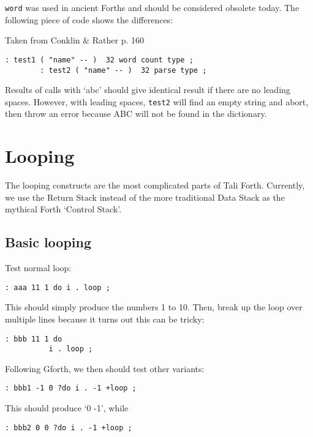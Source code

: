 \texttt{word} was used in ancient Forths and should be
considered obsolete today. The following piece of code shows the differences:

Taken from Conklin \& Rather p. 160

\begin{lstlisting}[frame=lines]
        : test1 ( "name" -- )  32 word count type ; 
        : test2 ( "name" -- )  32 parse type ; 
\end{lstlisting}

\noindent Results of calls with `abc' should give identical result if there are no
leading spaces. However, with leading spaces, \texttt{test2} will find an empty string
and abort, then throw an error because ABC will not be found in the dictionary.

\section{Looping}

The looping constructs are the most complicated parts of Tali Forth. Currently,
we use the Return Stack instead of the more traditional Data Stack as the
mythical Forth `Control Stack'.

\subsection{Basic looping}

Test normal loop:
\begin{lstlisting}[frame=lines]
        : aaa 11 1 do i . loop ;        
\end{lstlisting}

\noindent This should simply produce the numbers 1 to 10. Then, break up the
loop over multiple lines because it turns out this can be tricky:

\begin{lstlisting}[frame=lines]
        : bbb 11 1 do 
          i . loop ; 
\end{lstlisting}

\noindent Following Gforth, we then should test other variants:

\begin{lstlisting}[frame=lines]
        : bbb1 -1 0 ?do i . -1 +loop ;
\end{lstlisting}

\noindent This should produce `0 -1', while

\begin{lstlisting}[frame=lines]
        : bbb2 0 0 ?do i . -1 +loop ;
\end{lstlisting}

